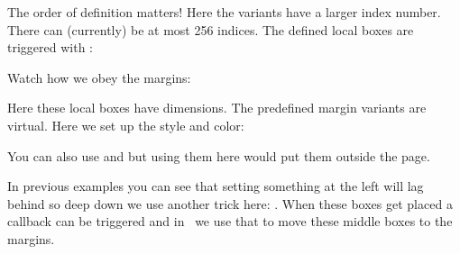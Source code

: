 \startbuffer[definition]

\stopbuffer

\typebuffer[definition][option=TEX]

\getbuffer[definition]

The order of definition matters! Here the  variants have a larger index
number. There can (currently) be at most 256 indices. The defined local boxes
are triggered with \type {\localbox}:

\startbuffer[example]
\startnarrower
{}%
\localbox[lefttext]{[L] }%
\localbox[lefttextx]{[LL] }%
\localbox[righttext]{ [RR]}%
\localbox[righttextx]{ [R]}%
%
\stopnarrower
\stopbuffer

\typebuffer[example][option=TEX]

Watch how we obey the margins:

\getbuffer[example]

Here these local boxes have dimensions. The predefined margin variants are
virtual. Here we set up the style and color:

\startbuffer[definition]
\setuplocalboxes
  [leftmargin]
  [style=\bs,
   color=darkgreen]
\setuplocalboxes
  [rightmargin]
  [style=\bs,
   color=darkred]
\stopbuffer

\typebuffer[definition][option=TEX]

\startbuffer[example]
\stopbuffer

\typebuffer[example][option=TEX]

You can also use  and  but using them here would
put them outside the page.

{}

In previous examples you can see that setting something at the left will lag behind
so deep down we use another trick here: \type {\localmiddlebox}. When these boxes
get placed a callback can be triggered and in \CONTEXT\ we use that to move these
middle boxes to the margins.

